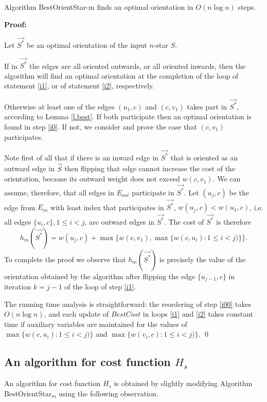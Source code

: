 \begin{theorem}\label{t.star}
Algorithm BestOrientStar-m finds an optimal orientation in  $O(n \log n)$ steps.
\end{theorem}  

\noindent \textbf{Proof:}

 Let $\vec{S^*}$ be an optimal orientation of the input $n$-star $S$.
 
 If in $\vec{S^*}$ the edges are all oriented outwards, or all oriented 
 inwards, then the algorithm will find an optimal orientation
 at the completion of the loop of statement \ref{i1}, or
of statement \ref{i2}, respectively.
 
 Otherwise at least one of the edges $(u_1,c)$ and $(c,v_1)$ takes part 
 in $\vec{S^*}$, according to Lemma \ref{l.best}. If both participate then an optimal orientation is found in step \ref{i0}.
 If not, we consider and prove the case that $(c,v_1)$ participates. 
 
 Note first of all that if there is an inward edge in $\vec{S^*}$ that is oriented as
 an outward edge in $\vec{S}$ then flipping that edge cannot
 increase the cost of the orientation, because its outward weight does not exceed $w(c,v_1)$.
 We can assume, therefore, that all edges in $E_{out}$ participate in $\vec{S^*}$. 
 Let $(u_j,c)$ be the 
 edge from $E_{in}$ with least index that participates in $\vec{S^*}$, 
  $w(u_j,c)<w(u_1,c)$, i.e. all edges $\{u_i,c\}, 1\leq i<j$, are outward edges in $\vec{S^*}$. 
 The cost of $\vec{S^*}$ is therefore 
 $$h_m(\vec{S^*})=w(u_j,c)+\max \{w(c,v_1),\max \{w(c,u_i):1\leq i<j)\}\}.$$
To complete the proof we observe that $h_m(\vec{S^*})$ is precisely the value of the orientation
obtained by the algorithm after flipping the edge  $\{u_{j-1},c\}$
 in iteration $k=j-1$ of the loop of step \ref{i1}.

The running time  analysis is straightforward: the reordering of step \ref{i00} takes
$O(n \log n)$, and each update of $BestCost$ in loops \ref{i1} and \ref{i2} takes 
constant time if  auxiliary variables are maintained for the values of 
$\max \{w(c,u_i):1\leq i<j)\}$ and $\max \{w(v_i,c):1\leq i<j)\}$.
 \qed
 
  \subsection{An algorithm for cost function $H_s$}
  An algorithm for cost function $H_s$ is obtained by slightly modifying Algorithm BestOrientStar$_m$ using the following observation.
  
